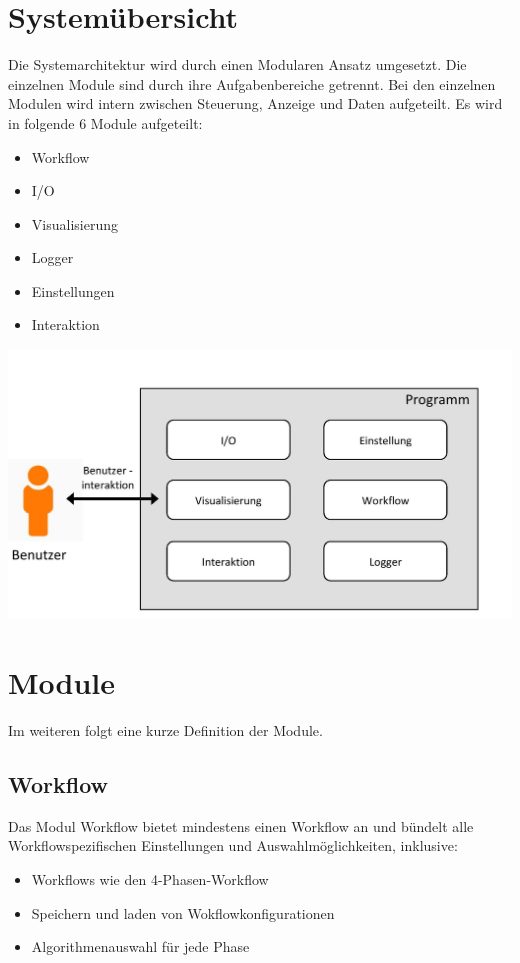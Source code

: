 \section{Systemübersicht}
Die Systemarchitektur wird durch einen Modularen Ansatz umgesetzt.
Die einzelnen Module sind durch ihre Aufgabenbereiche getrennt.
Bei den einzelnen Modulen wird intern zwischen Steuerung, Anzeige und Daten aufgeteilt.
Es wird in folgende 6 Module aufgeteilt:

\begin{itemize}
\item Workflow
\item I/O
\item Visualisierung
\item Logger
\item Einstellungen
\item Interaktion
\end{itemize}
\includegraphics[scale=0.5]{img/Uebersicht.jpg} 

\newpage 
\section{Module}
Im weiteren folgt eine kurze Definition der Module.

\subsection{Workflow}
Das Modul Workflow bietet mindestens einen Workflow an und bündelt alle Workflowspezifischen
Einstellungen und Auswahlmöglichkeiten, inklusive:

\begin{itemize}
\item Workflows wie den 4-Phasen-Workflow
\item Speichern und laden von Wokflowkonfigurationen
\item Algorithmenauswahl für jede Phase 
\end{itemize}

